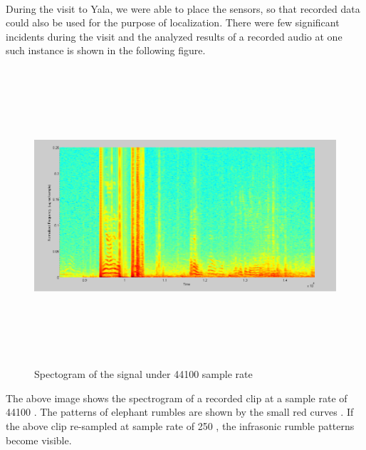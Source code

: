 \documentclass[12pt]{article}
\numberwithin{figure}{section}
\numberwithin{table}{section}
\begin{document}
\paragraph{}
During the visit to Yala, we were able to place the sensors, so that recorded data could also be used for the purpose of localization. There were few significant incidents during the visit and the analyzed results of a recorded audio at one such instance is shown in the following figure.

\begin{figure}[H]
\centering
\includegraphics[width=14cm,height=11cm,keepaspectratio]{44100.png}
\caption{Spectogram of the signal under 44100 sample rate}
\label{d:44100}
\end{figure}

The above image shows the spectrogram of a recorded clip at a sample rate of 44100 . The patterns of elephant rumbles are shown by the small red curves \cite {19}. If the above clip re-sampled at sample rate of 250 , the infrasonic rumble patterns become visible.
\end{document}

